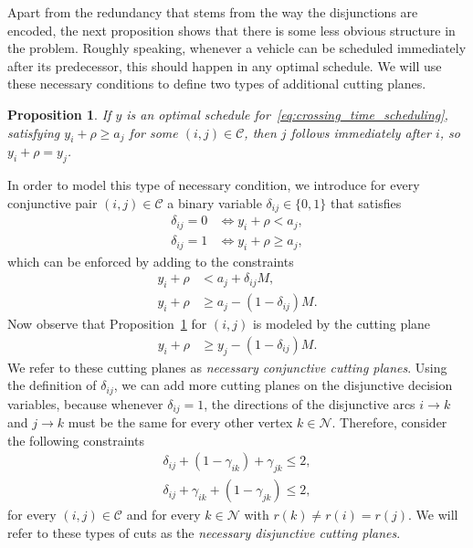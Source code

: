 \documentclass[a4paper]{article}
\theoremstyle{definition}
\theoremstyle{plain}
\newtheorem{proposition}{Proposition}
\begin{document}

Apart from the redundancy that stems from the way the disjunctions are encoded,
the next proposition shows that there is some less obvious structure in the
problem. Roughly speaking, whenever a vehicle can be scheduled immediately after
its predecessor, this should happen in any optimal schedule. We will use these
necessary conditions to define two types of additional cutting planes.

\begin{proposition}\label{prop:exhaustive}
  If $y$ is an optimal schedule for~\eqref{eq:crossing_time_scheduling},
  satisfying $y_{i} + \rho \geq a_{j}$ for some $(i,j) \in \mathcal{C}$, then $j$
  follows immediately after $i$, so $y_{i} + \rho = y_{j}$.
\end{proposition}

In order to model this type of necessary condition, we introduce for every
conjunctive pair $(i,j) \in \mathcal{C}$ a binary variable $\delta_{ij} \in \{0, 1\}$ that
satisfies
\begin{align*}
  \delta_{ij} = 0 &\iff y_{i} + \rho < a_{j} , \\
  \delta_{ij} = 1 &\iff y_{i} + \rho \geq a_{j} ,
\end{align*}
which can be enforced by adding to the constraints
\begin{align*}
  y_{i} + \rho &< a_{j} + \delta_{ij}M , \\
  y_{i} + \rho &\geq a_{j} - (1 - \delta_{ij}) M .
\end{align*}
Now observe that Proposition~\ref{prop:exhaustive} for $(i,j)$ is modeled by the
cutting plane
\begin{align*}
  y_{i} + \rho &\geq y_{j} - (1 - \delta_{ij}) M .
\end{align*}
We refer to these cutting planes as \textit{necessary conjunctive cutting planes}.
%
Using the definition of $\delta_{ij}$, we can add more cutting planes on the
disjunctive decision variables, because whenever $\delta_{ij} = 1$, the directions of
the disjunctive arcs $i \rightarrow k$ and $j \rightarrow k$ must be the same for every other vertex
$k \in \mathcal{N}$. Therefore, consider the following constraints
\begin{align*}
  \delta_{ij} + (1 - \gamma_{ik}) + \gamma_{jk} \leq 2 , \\
  \delta_{ij} + \gamma_{ik} + (1 - \gamma_{jk}) \leq 2 ,
\end{align*}
for every $(i,j) \in \mathcal{C}$ and for every $k \in \mathcal{N}$ with $r(k) \neq r(i) = r(j)$.
We will refer to these types of cuts as the \textit{necessary disjunctive cutting planes}.
\end{document}
